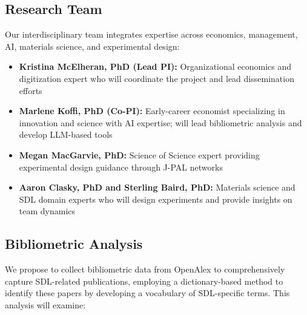 \documentclass[11pt,letterpaper,twocolumn]{article}
\begin{document}
\subsection{Research Team}
Our interdisciplinary team integrates expertise across economics, management, AI, materials science, and experimental design:
\begin{itemize}
    \item \textbf{Kristina McElheran, PhD (Lead PI):} Organizational economics and digitization expert who will coordinate the project and lead dissemination efforts
    \item \textbf{Marlene Koffi, PhD (Co-PI):} Early-career economist specializing in innovation and science with AI expertise; will lead bibliometric analysis and develop LLM-based tools
    \item \textbf{Megan MacGarvie, PhD:} Science of Science expert providing experimental design guidance through J-PAL networks
    \item \textbf{Aaron Clasky, PhD and Sterling Baird, PhD:} Materials science and SDL domain experts who will design experiments and provide insights on team dynamics
\end{itemize}

\subsection{Bibliometric Analysis}
We propose to collect bibliometric data from OpenAlex to comprehensively capture SDL-related publications, employing a dictionary-based method to identify these papers by developing a vocabulary of SDL-specific terms. This analysis will examine:
\end{document}
